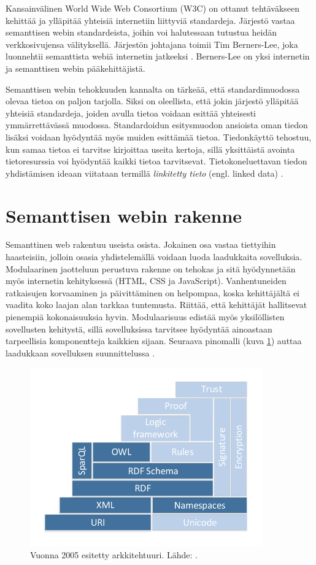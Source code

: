 \documentclass[finnish, 12pt, a4paper, elec, utf8, pdfa, online]{aaltothesis}
\begin{document}
Kansainvälinen World Wide Web Consortium (W3C) on ottanut tehtäväkseen kehittää ja ylläpitää yhteisiä internetiin liittyviä standardeja. Järjestö vastaa semanttisen webin standardeista, joihin voi halutessaan tutustua heidän verkkosivujensa välityksellä. Järjestön johtajana toimii Tim Berners-Lee, joka luonnehtii semanttista webiä internetin jatkeeksi \cite{W3C} \cite{Berners_visio}. Berners-Lee on yksi internetin ja semanttisen webin pääkehittäjistä.

Semanttisen webin tehokkuuden kannalta on tärkeää, että standardimuodossa olevaa tietoa on paljon tarjolla. Siksi on oleellista, että jokin järjestö ylläpitää yhteisiä standardeja, joiden avulla tietoa voidaan esittää yhteisesti ymmärrettävässä muodossa. Standardoidun esitysmuodon ansioista oman tiedon lisäksi voidaan hyödyntää myös muiden esittämää tietoa. Tiedonkäyttö tehostuu, kun samaa tietoa ei tarvitse kirjoittaa useita kertoja, sillä yksittäistä avointa tietoresurssia voi hyödyntää kaikki tietoa tarvitsevat. Tietokoneluettavan tiedon yhdistämisen ideaan viitataan termillä \textit{linkitetty tieto} (engl. linked data) \cite{linked_w3c} \cite{linked_data_finlad}.

\clearpage
\section{Semanttisen webin rakenne}
Semanttinen web rakentuu useista osista. Jokainen osa vastaa tiettyihin haasteisiin, jolloin osasia yhdistelemällä voidaan luoda laadukkaita sovelluksia. Modulaarinen jaotteluun perustuva rakenne on tehokas ja sitä hyödynnetään myös internetin kehityksessä (HTML, CSS ja JavaScript). Vanhentuneiden ratkaisujen korvaaminen ja päivittäminen on helpompaa, koska kehittäjältä ei vaadita koko laajan alan tarkkaa tuntemusta. Riittää, että kehittäjät hallitsevat pienempiä kokonaisuuksia hyvin. Modulaarisuus edistää myös yksilöllisten sovellusten kehitystä, sillä sovelluksissa tarvitsee hyödyntää ainoastaan tarpeellisia komponentteja kaikkien sijaan. Seuraava pinomalli (kuva \ref{images/sweb-stack2.pdf}) auttaa laadukkaan sovelluksen suunnittelussa \cite{stack}.

\begin{figure}[htb]
\centering
\includegraphics[width=10cm]{images/sweb-stack2.pdf}
\caption{Vuonna 2005 esitetty arkkitehtuuri. Lähde: \cite{stack}. \label{images/sweb-stack2.pdf}}
\end{figure}
\end{document}
